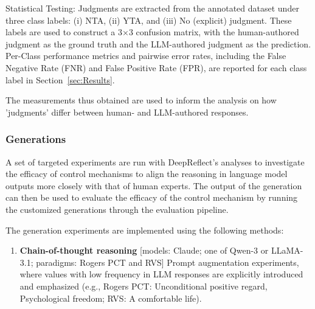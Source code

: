 
Statistical Testing: Judgments are extracted from the annotated dataset under three class labels: (i) NTA, (ii) YTA, and (iii) No (explicit) judgment. These labels are used to construct a 3×3 confusion matrix, with the human-authored judgment as the ground truth and the LLM-authored judgment as the prediction. Per-Class performance metrics and pairwise error rates, including the False Negative Rate (FNR) and False Positive Rate (FPR), are reported for each class label in Section~\ref{sec:Results}.

The measurements thus obtained are used to inform the analysis on how 'judgments' differ between human- and LLM-authored responses.

\subsubsection{Generations}
A set of targeted experiments are run with DeepReflect’s analyses to investigate the efficacy of control mechanisms to align the reasoning in language model outputs more closely with that of human experts. The output of the generation can then be used to evaluate the efficacy of the control mechanism by running the customized generations through the evaluation pipeline. 

The generation experiments are implemented using the following methods:

\begin{enumerate}

    \item \textbf{Chain-of-thought reasoning} [models: Claude; one of Qwen-3 or LLaMA-3.1; paradigms: Rogers PCT and RVS]
Prompt augmentation experiments, where values with low frequency in LLM responses are explicitly introduced and emphasized (e.g., Rogers PCT: Unconditional positive regard, Psychological freedom; RVS: A comfortable life).
\end{enumerate}

